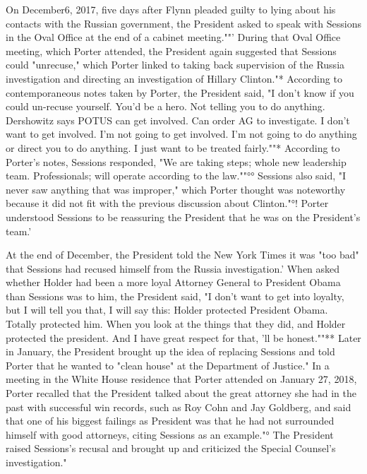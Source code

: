 On December6, 2017, five days after Flynn pleaded guilty to lying about his contacts with the Russian government, the President asked to speak with Sessions in the Oval Office at the end of a cabinet meeting.""'
During that Oval Office meeting, which Porter attended, the President again suggested that Sessions could "unrecuse," which Porter linked to taking back supervision of the Russia investigation and directing an investigation of Hillary Clinton."*
According to contemporaneous notes taken by Porter, the President said, "I don't know if you could un-recuse yourself.
You'd be a hero.
Not telling you to do anything.
Dershowitz says POTUS can get involved.
Can order AG to investigate.
I don't want to get involved.
I'm not going to get involved.
I'm not going to do anything or direct you to do anything.
I just want to be treated fairly.""*
According to Porter's notes, Sessions responded, "We are taking steps; whole new leadership team.
Professionals; will operate according to the law.""°°
Sessions also said, "I never saw anything that was improper," which Porter thought was noteworthy because it did not fit with the previous discussion about Clinton."°!
Porter understood Sessions to be reassuring the President that he was on the President's team.'

At the end of December, the President told the New York Times it was "too bad" that Sessions had recused himself from the Russia investigation.'
When asked whether Holder had been a more loyal Attorney General to President Obama than Sessions was to him, the President said, "I don't want to get into loyalty, but I will tell you that, I will say this: Holder protected President Obama.
Totally protected him.
When you look at the things that they did, and Holder protected the president.
And I have great respect for that, 'll be honest.""**
Later in January, the President brought up the idea of replacing Sessions and told Porter that he wanted to "clean house" at the Department of Justice."
In a meeting in the White House residence that Porter attended on January 27, 2018, Porter recalled that the President talked about the great attorney she had in the past with successful win records, such as Roy Cohn and Jay Goldberg, and said that one of his biggest failings as President was that he had not surrounded himself with good attorneys, citing Sessions as an example."°
The President raised Sessions's recusal and brought up and criticized the Special Counsel's investigation."

